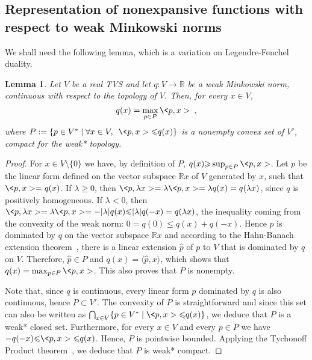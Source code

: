 \documentclass[a4paper,11pt]{amsart}
\newtheorem{lemma}[theorem]{Lemma}
\theoremstyle{definition}
\theoremstyle{remark}
\begin{document}
\subsection{Representation of nonexpansive functions with respect to weak Minkowski norms}
We shall need the following lemma, which is a variation on Legendre-Fenchel duality.
\begin{lemma}
  \label{lem:RepresentationWeakNorm}
  Let $V$ be a real TVS and let $q: V \to {\mathbb{R}}$ be a weak Minkowski norm, continuous with respect to the topology of $V$.
  Then, for every $x \in V$,
  \begin{equation}
    \label{eq:RepresentationWeakNorm}
    q(x) = \max_{p \in P} \<p,x> \enspace ,
  \end{equation}
  where $P := \{ p \in V^* \mid \forall x \in V, \enspace \<p,x> {\leqslant} q(x) \}$ is a nonempty convex set of $V'$, compact for the weak* topology.
\end{lemma}
\begin{proof}
  For $x \in V \setminus \{0\}$ we have, by definition of $P$, $q(x) {\geqslant}  \sup_{p \in P} \<p,x>$.
  Let $p$ be the linear form defined on the vector subspace ${\mathbb{R}} x$ of $V$ generated by $x$, such that $\<p,x>=q(x)$.
  If $\lambda {\geqslant} 0$, then $\<p,\lambda x> = \lambda \<p,x> = \lambda q(x) = q(\lambda x)$, since $q$ is positively homogeneous.
  If $\lambda < 0$, then $\<p,\lambda x> = \lambda \<p,x> = - |\lambda| q(x) {\leqslant} |\lambda| q(-x) = q(\lambda x)$, the inequality coming from the convexity of the weak norm: $0 = q(0) {\leqslant} q(x)+q(-x)$.
  Hence $p$ is dominated by $q$ on the vector subspace ${\mathbb{R}} x$ and according to the Hahn-Banach extension theorem~\cite[Theorem 5.53]{AB06}, there is a linear extension $\hat p$ of $p$ to $V$ that is dominated by $q$ on $V$.
  Therefore, $\hat p \in P$ and $q(x)={\langle \hat p, x\rangle}$, which shows that $q(x) = \max_{p \in P} \<p,x>$.
  This also proves that $P$ is nonempty.

  Note that, since $q$ is continuous, every linear form $p$ dominated by $q$ is also continuous, hence $P \subset V'$.
  The convexity of $P$ is straightforward and since this set can also be written as $\bigcap_{x \in V} \{ p \in V^* \mid \<p,x> {\leqslant} q(x) \}$, we deduce that $P$ is a weak* closed set.
  Furthermore, for every $x \in V$ and every $p \in P$ we have $-q(-x) {\leqslant} \<p,x> {\leqslant} q(x)$.
  Hence, $P$ is pointwise bounded.
  Applying the Tychonoff Product theorem~\cite[Theorem 2.61]{AB06}, we deduce that $P$ is weak* compact.
\end{proof}
\end{document}
